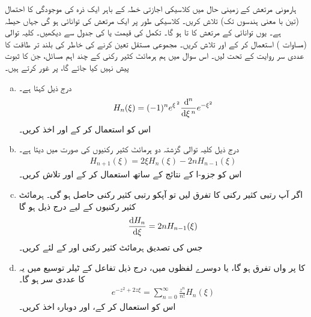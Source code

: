 ہارمونی مرتعش کے زمینی حال میں کلاسیکی اجازتی خطہ کے باہر ایک ذرہ کی موجودگی کا احتمال (تین با معنی ہندسوں تک) تلاش کریں۔
 کلاسیکی طور پر ایک مرتعش کی توانائی  ہو گی جہاں  حیطہ ہے۔ یوں توانائی  کے مرتعش کا   تا  ہو گا۔ تکمل کی قیمت  یا  کی جدول سے دیکھیں۔
%
کلیہ توالی (مساوات ) استعمال کر کے  اور 
تلاش کریں۔ مجموعی مستقل تعین کرنے کی خاطر  کی بلند تر طاقت کا عددی سر روایت کے تحت  لیں۔
%
اس سوال میں ہم ہرمائٹ کثیر رکنی کے چند اہم مسائل، جن کا ثبوت پیش نہیں کیا جائے گا، پر غور کرتے ہیں۔
\begin{enumerate}[a.]
\item
{} درج ذیل کہتا ہے۔
\begin{align}
H_{n}(\xi)=(-1)^{n}e^{\xi^{\,2}}\frac{\dif^{\,n} }{\dif \xi^{\,n}}e^{-\xi^{2}}
\end{align}
اس کو استعمال کر کے  اور  اخذ کریں۔
\item
درج ذیل کلیہ توالی گزشتہ دو ہرمائٹ کثیر رکنیوں کی صورت میں  دیتا ہے۔
\begin{align}
H_{n+1}(\xi)=2\xi H_{n}(\xi)-2nH_{n-1}(\xi)
\end{align}
اس کو جزو-ا کے نتائج کے ساتھ استعمال کر کے  اور  تلاش کریں۔
\item
اگر آپ  رتبی کثیر رکنی کا تفرق لیں تو آپکو  رتبی کثیر رکنی حاصل ہو گی۔ ہرمائٹ کثیر رکنیوں کے لیے درج ذیل ہو گا
\begin{align}
\frac{\dif{H_{n}}}{\dif{\xi}}=2nH_{n-1}(\xi)
\end{align}
جس کی تصدیق ہرمائٹ کثیر رکنی  اور  کے لئے کریں۔ 
\item
{}  کا  پر  واں تفرق  ہو گا، یا دوسرے لفظوں میں، درج ذیل تفاعل کے ٹیلر  توسیع  میں یہ
 کا عددی سر ہو گا۔
\begin{align}
e^{-z^{2}+2z\xi}=\sum_{n=0}^{\infty}\frac{z^{n}}{n!}H_{n}(\xi)
\end{align}
اس کو استعمال کر کے،  اور  دوبارہ اخذ کریں۔
\end{enumerate}

